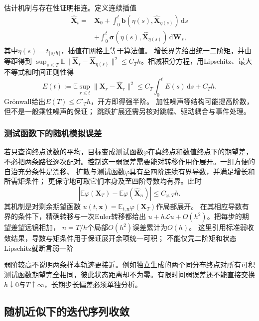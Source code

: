 估计机制与存在性证明相连。定义连续插值
\[
 \begin{split}
 \widehat{\bm X}_t={}&\bm X_0+
    \int_0^t\bm b(\eta(s),\widehat{\bm X}_{\eta(s)})\,\mathrm ds\\
 &+\int_0^t\bm\sigma(\eta(s),\widehat{\bm X}_{\eta(s)})\,\mathrm d\bm W_s,
 \end{split}
\]
其中$\eta(s)=t_{\lfloor s/h\rfloor}$，插值在网格上等于算法值。
增长界先给出统一二阶矩，并由等距得到
$\sup_{s\leq T}\mathbb E\|\widehat{\bm X}_s-\widehat{\bm X}_{\eta(s)}\|^2
\leq C_T h$。相减积分方程，用Lipschitz、最大不等式和时间正则性得
\[
 E(t):=\mathbb E\sup_{r\leq t}\|\bm X_r-\widehat{\bm X}_r\|^2
       \leq C_T\int_0^tE(s)\,\mathrm ds+C_T h.
\]
Grönwall给出$E(T)\leq C'_T h$，开方即得强半阶。
加性噪声等结构可能提高阶数，但不是一般乘性噪声的保证；
跳跃扩展还需另核对跳幅、驱动耦合与事件处理。

\subsubsection{测试函数下的随机模拟误差}
若只查询终点读数的平均，目标变成测试函数$\varphi$在真终点和数值终点下的期望差，不必把两条路径逐次配对。控制这一弱误差需要能对转移作用作展开。一组方便的自治充分条件是漂移、
扩散与测试函数$\varphi$具有至四阶连续有界导数，并满足增长和所需矩条件；
更保守地可取它们本身及至四阶导数均有界。此时
\[
  |\mathbb E\varphi(\bm X_T)-\mathbb E\varphi(\widehat{\bm X}_n)|
        \leq C_{\varphi,T}h.
\]
其机制是对剩余期望函数
$u(t,\bm x)=\mathbb E_{t,\bm x}\varphi(\bm X_T)$作局部展开。
在其相应导数有界的条件下，精确转移与一次Euler转移都给出
$u+h\mathcal L u+O(h^2)$。把每步的期望差望远镜相加，
$n=T/h$个局部$O(h^2)$误差累计为$O(h)$。
这里引用标准弱收敛结果，导数与矩条件用于保证展开余项统一可积；
不能仅凭二阶矩和状态Lipschitz就断言弱一阶

弱阶较高不说明两条样本轨迹更接近。例如独立生成的两个同分布终点对所有可积
测试函数期望完全相同，彼此状态距离却不为零。有限时间弱误差还不能直接交换
$h\downarrow0$与$T\uparrow\infty$，长期步长偏差必须单独分析。

\subsection{随机近似下的迭代序列收敛}
\label{sec:stoch-approximation-markov-noise}

